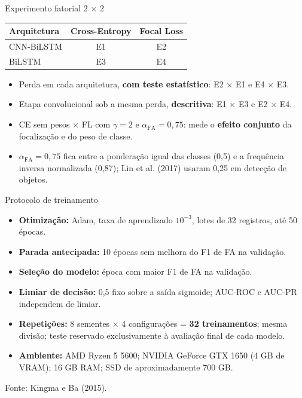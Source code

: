 \documentclass[aspectratio=169,12pt,brazil]{beamer}
\begin{document}
\begin{frame}{Experimento fatorial 2 × 2}
  \centering
  \begin{tabular}{lcc}
    \toprule
    \textbf{Arquitetura} & \textbf{Cross-Entropy} & \textbf{Focal Loss} \\
    \midrule
    CNN-BiLSTM & E1 & E2 \\
    BiLSTM & E3 & E4 \\
    \bottomrule
  \end{tabular}
  \vspace{.45cm}

  \small
  \begin{itemize}
    \item Perda em cada arquitetura, \textbf{com teste estatístico}: E2 × E1 e E4 × E3.
    \item Etapa convolucional sob a mesma perda, \textbf{descritiva}: E1 × E3 e E2 × E4.
    \item CE sem pesos × FL com $\gamma=2$ e $\alpha_{\mathrm{FA}}=0{,}75$: mede o \textbf{efeito conjunto} da focalização e do peso de classe.
    \item $\alpha_{\mathrm{FA}}=0{,}75$ fica entre a ponderação igual das classes (0,5) e a frequência inversa normalizada (0,87); Lin et al. (2017) usaram 0,25 em detecção de objetos.  
  \end{itemize}
\end{frame}

\begin{frame}{Protocolo de treinamento}
  \begin{itemize}
    \item \textbf{Otimização:} Adam, taxa de aprendizado $10^{-3}$, lotes de 32 registros, até 50 épocas.
    \item \textbf{Parada antecipada:} 10 épocas sem melhora do F1 de FA na validação.
    \item \textbf{Seleção do modelo:} época com maior F1 de FA na validação.
    \item \textbf{Limiar de decisão:} 0,5 fixo sobre a saída sigmoide; AUC-ROC e AUC-PR independem de limiar.
    \item \textbf{Repetições:} 8 sementes × 4 configurações = \textbf{32 treinamentos}; mesma divisão; teste reservado exclusivamente à avaliação final de cada modelo.
    \item \textbf{Ambiente:} AMD Ryzen 5 5600; NVIDIA GeForce GTX 1650 (4 GB de VRAM); 16 GB RAM; SSD de aproximadamente 700 GB.
  \end{itemize}
  {\scriptsize Fonte: Kingma e Ba (2015).}
\end{frame}
\end{document}

